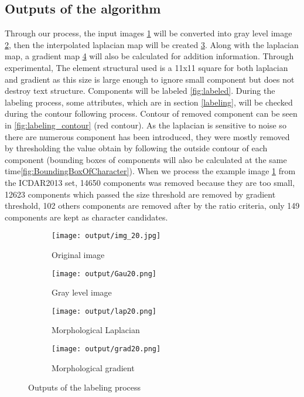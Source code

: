 \subsection*{Outputs of the algorithm}
Through our process, the input images \ref{fig:inputImage} will be converted into gray level image \ref{fig:grayScale}, then the interpolated laplacian map will be created \ref{fig:Laplacian}. Along with the laplacian map, a gradient map \ref{fig:gradient} will also be calculated for addition information. Through experimental, The element structural used is a 11x11 square for both laplacian and gradient as this size is large enough to ignore small component but does not destroy text structure. Components will be labeled \ref{fig:labeled}. During the labeling process, some attributes, which are in section \ref{labeling}, will be checked during the contour following process. Contour of removed component can be seen in \ref{fig:labeling_contour} (red contour). As the laplacian is sensitive to noise so there are numerous component has been introduced, they were mostly removed by thresholding the value obtain by following the outside contour of each component (bounding boxes of components will also be calculated at the same time\ref{fig:BoundingBoxOfCharacter}). When we process the example image \ref{fig:inputImage} from the ICDAR2013 set, 14650 components was removed because they are too small, 12623 components which passed the size threshold are removed by gradient threshold, 102 others components are removed after by the ratio criteria, only 149 components are kept as character candidates. 


\begin{figure}

	\begin{subfigure}[b]{0.45\textwidth}
	 	\texttt{[image: output/img\_20.jpg]} \caption{Original image}\label{fig:inputImage} \end{subfigure}
	\begin{subfigure}[b]{0.45\textwidth}
	 	\texttt{[image: output/Gau20.png]} \caption{Gray level image}\label{fig:grayScale} \end{subfigure}	 	
\centering		
		
	\begin{subfigure}[b]{0.45\textwidth}
		\texttt{[image: output/lap20.png]}  \caption{Morphological Laplacian}\label{fig:Laplacian} \end{subfigure}	
	\begin{subfigure}[b]{0.45\textwidth}
		\texttt{[image: output/grad20.png]}  \caption{Morphological gradient}\label{fig:gradient} \end{subfigure}	
\centering

	\caption[Outputs of the labeling process] {Outputs of the labeling process}
	\label{fig:output}
\end{figure}


